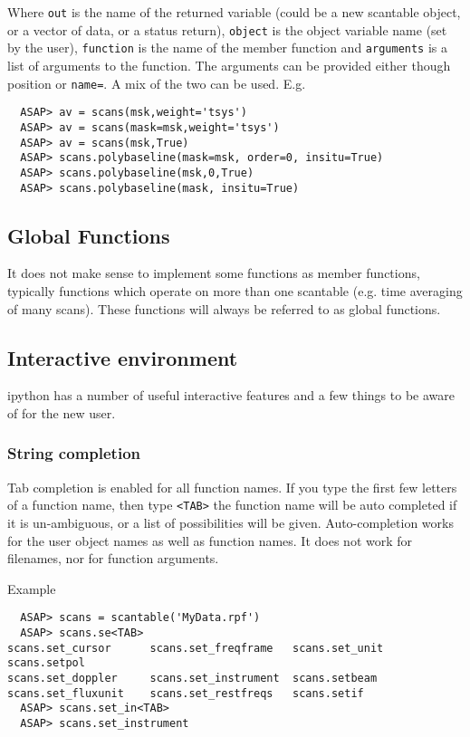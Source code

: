 \documentclass[11pt]{article}
\newcommand{\cmd}[1]{{\tt #1}}
\begin{document}
Where \cmd{out} is the name of the returned variable (could be a new
scantable object, or a vector of data, or a status return),
\cmd{object} is the object variable name (set by the user),
\cmd{function} is the name of the member function and \cmd{arguments}
is a list of arguments to the function. The arguments can be provided
either though position or \cmd{name=}.  A mix of the two can be used.
E.g.

\begin{verbatim}
  ASAP> av = scans(msk,weight='tsys')
  ASAP> av = scans(mask=msk,weight='tsys')
  ASAP> av = scans(msk,True)
  ASAP> scans.polybaseline(mask=msk, order=0, insitu=True)
  ASAP> scans.polybaseline(msk,0,True)
  ASAP> scans.polybaseline(mask, insitu=True)
\end{verbatim}

\subsection{Global Functions}

It does not make sense to implement some functions as member
functions, typically functions which operate on more than one
scantable (e.g. time averaging of many scans). These functions will
always be referred to as global functions.

\subsection{Interactive environment}

ipython has a number of useful interactive features and a few things to be aware
of for the new user.

\subsubsection{String completion}

Tab completion is enabled for all function names. If you type the
first few letters of a function name, then type {\tt <TAB>} the
function name will be auto completed if it is un-ambiguous, or a list
of possibilities will be given. Auto-completion works for the user
object names as well as function names. It does not work for
filenames, nor for function arguments.

Example
\begin{verbatim}
  ASAP> scans = scantable('MyData.rpf')
  ASAP> scans.se<TAB>
scans.set_cursor      scans.set_freqframe   scans.set_unit        scans.setpol
scans.set_doppler     scans.set_instrument  scans.setbeam         
scans.set_fluxunit    scans.set_restfreqs   scans.setif     
  ASAP> scans.set_in<TAB>
  ASAP> scans.set_instrument
\end{verbatim}
\end{document}
